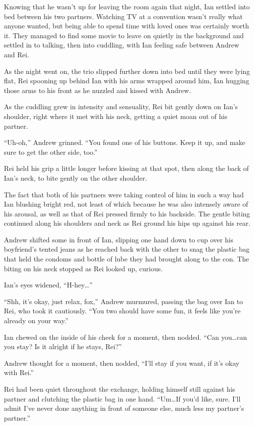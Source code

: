 \documentclass[12pt,letterpaper,oneside]{memoir}
\begin{document}
  Knowing that he wasn't up for leaving the room again that night, Ian settled into bed between his two partners. Watching TV at a convention wasn't really what anyone wanted, but being able to spend time with loved ones was certainly worth it. They managed to find some movie to leave on quietly in the background and settled in to talking, then into cuddling, with Ian feeling safe between Andrew and Rei.

  As the night went on, the trio slipped further down into bed until they were lying flat, Rei spooning up behind Ian with his arms wrapped around him, Ian hugging those arms to his front as he nuzzled and kissed with Andrew.

  As the cuddling grew in intensity and sensuality, Rei bit gently down on Ian's shoulder, right where it met with his neck, getting a quiet moan out of his partner.

  ``Uh-oh,'' Andrew grinned. ``You found one of his buttons. Keep it up, and make sure to get the other side, too.''

  Rei held his grip a little longer before kissing at that spot, then along the back of Ian's neck, to bite gently on the other shoulder.

  The fact that both of his partners were taking control of him in such a way had Ian blushing bright red, not least of which because he was also intensely aware of his arousal, as well as that of Rei pressed firmly to his backside. The gentle biting continued along his shoulders and neck as Rei ground his hips up against his rear.

  Andrew shifted some in front of Ian, slipping one hand down to cup over his boyfriend's tented jeans as he reached back with the other to snag the plastic bag that held the condoms and bottle of lube they had brought along to the con. The biting on his neck stopped as Rei looked up, curious.

  Ian's eyes widened, ``H-hey\ldots{}''

  ``Shh, it's okay, just relax, fox,'' Andrew murmured, passing the bag over Ian to Rei, who took it cautiously. ``You two should have some fun, it feels like you're already on your way.''

  Ian chewed on the inside of his cheek for a moment, then nodded. ``Can you\ldots{}can you stay? Is it alright if he stays, Rei?''

  Andrew thought for a moment, then nodded, ``I'll stay if you want, if it's okay with Rei.''

  Rei had been quiet throughout the exchange, holding himself still against his partner and clutching the plastic bag in one hand. ``Um\ldots{}If you'd like, sure. I'll admit I've never done anything in front of someone else, much less my partner's partner.''
\end{document}
